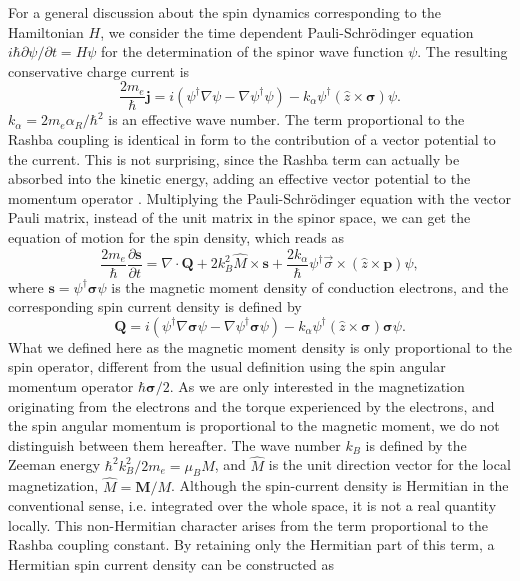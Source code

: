 \documentclass[12pt]{iopart}
\begin{document}
For a general discussion about the spin dynamics corresponding to the Hamiltonian $H$, we consider the time dependent Pauli-Schr\"{o}dinger equation $i \hbar \partial \psi/ \partial t = H \psi$ for the determination of the spinor wave function $\psi$. The resulting conservative charge current is
\begin{equation}
\frac{2 m_e} {\hbar} \textbf{j} = i (\psi ^ \dagger \nabla \psi - \nabla \psi ^ \dagger  \psi) - k_\alpha \psi ^ \dagger ( \hat{z} \times\bm{\sigma}) \psi.
\end{equation}
$k_\alpha = 2 m_e \alpha_R/\hbar^2$ is an effective wave number. The term proportional to the Rashba coupling is identical in form to the contribution of a vector potential to the current. This is not surprising, since the Rashba term can actually be absorbed into the kinetic energy, adding an effective vector potential to the momentum operator \cite{kim13}. Multiplying the Pauli-Schr\"{o}dinger equation with the vector Pauli matrix, instead of the unit matrix in the spinor space, we can get the equation of motion for the spin density, which reads as
\begin{equation}
\frac{2 m_e} {\hbar} \frac{\partial \textbf{s}} {\partial t} = \nabla \cdot \textbf{Q} + 2k_B^2 \hat{M} \times \textbf{s} + \frac{2k_\alpha}{\hbar}  \psi ^ \dagger \vec{\sigma} \times (\hat{z} \times \textbf{p}) \psi,
\end{equation}
where $\textbf{s} = \psi^ \dagger \bm{\sigma} \psi$ is the magnetic moment density of conduction electrons, and the corresponding spin current density is defined by
\begin{equation}
\textbf{Q} = i (\psi ^ \dagger \nabla \bm{\sigma} \psi - \nabla \psi ^ \dagger \bm{\sigma} \psi) - k_\alpha \psi ^ \dagger ( \hat{z} \times \bm {\sigma}) \bm{\sigma} \psi.
\end{equation}
What we defined here as the magnetic moment density is only proportional to the spin operator, different from the usual definition using the spin angular momentum operator $\hbar \bm{\sigma}/2$. As we are only interested in the magnetization originating from the electrons and the torque experienced by the electrons, and the spin angular momentum is proportional to the magnetic moment, we do not distinguish between them hereafter. The wave number $k_B$ is defined by the Zeeman energy $\hbar^2 k_B^2/2 m_e = \mu_B M$, and $\hat {M}$ is the unit direction vector for the local magnetization, $\hat {M} = \textbf {M}/M$. Although the spin-current density is Hermitian in the conventional sense, i.e. integrated over the whole space, it is not a real quantity locally. This non-Hermitian character arises from the term proportional to the Rashba coupling constant. By retaining only the Hermitian part of this term, a Hermitian spin current density can be constructed as
\end{document}
